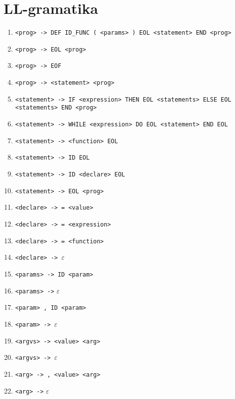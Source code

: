 \documentclass [11pt, a4paper]{article}
\begin{document}
\section{LL-gramatika}
\begin{table}[!ht]
	\centering
    \begin{enumerate}[noitemsep]
        \item \verb|<prog> -> DEF ID_FUNC ( <params> ) EOL <statement> END <prog>|
        \item \verb|<prog> -> EOL <prog>|
        \item \verb|<prog> -> EOF|
        \item \verb|<prog> -> <statement> <prog>|
        
        \item \verb|<statement> -> IF <expression> THEN EOL <statements> ELSE EOL <statements> END <prog>|
        \item \verb|<statement> -> WHILE <expression> DO EOL <statement> END EOL|
        \item \verb|<statement> -> <function> EOL|
        \item \verb|<statement> -> ID EOL|
        \item \verb|<statement> -> ID <declare> EOL|
        \item \verb|<statement> -> EOL <prog>|
        
        \item \verb|<declare> -> = <value>|
        \item \verb|<declare> -> = <expression>|
        \item \verb|<declare> -> = <function>|
        \item \verb|<declare> -> |$\varepsilon$
        
        \item \verb|<params> -> ID <param>|
        \item \verb|<params> ->| $\varepsilon$
        
        \item \verb|<param> , ID <param>|
        \item \verb|<param> -> |$\varepsilon$
    
        \item \verb|<argvs> -> <value> <arg>|
        \item \verb|<argvs> -> |$\varepsilon$
        
        \item \verb|<arg> -> , <value> <arg>|
        \item \verb|<arg> ->| $\varepsilon$
        

\end{enumerate}
\end{table}
\end{document}
